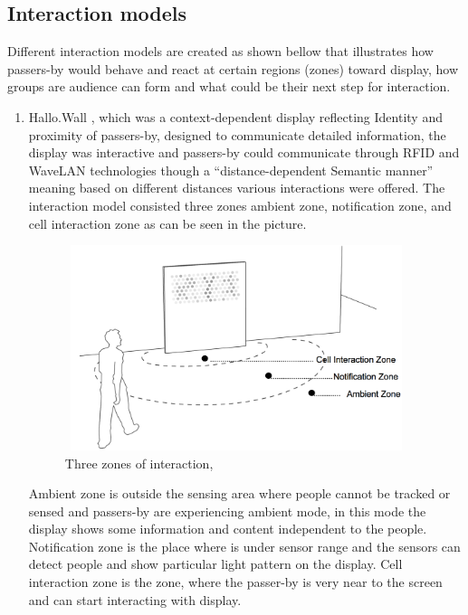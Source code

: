 \subsection{Interaction models}
Different interaction models are created as shown bellow that illustrates how passers-by would behave and react at certain regions (zones) toward display, how groups are audience can form and what could be their next step for interaction. 


\begin{enumerate}


\item Hallo.Wall \cite{hello_wall, hellow_wall_2}, which was a context-dependent display reflecting Identity and proximity of passers-by, designed to communicate detailed information, the display was interactive and passers-by could communicate through RFID and WaveLAN technologies though a “distance-dependent Semantic manner” meaning based on different distances various interactions were offered. The interaction model consisted three zones ambient zone, notification zone, and cell interaction zone as can be seen in the picture. 

\begin{figure}[H]
\centering
\includegraphics[width=100mm,height=60mm]{Figures/2/hello_wall}
\caption{Three zones of interaction, \cite{hellow_wall_2}}
\label{fig:threezoneofinteraction}
\end{figure}

Ambient zone is outside the sensing area where people cannot be tracked or sensed and passers-by are experiencing ambient mode, in this mode the display shows some information and content independent to the people. Notification zone is the place where is under sensor range and the sensors can detect people and show particular light pattern on the display. Cell interaction zone is the zone, where the passer-by is very near to the screen and can start interacting with display. 



\end{enumerate}
